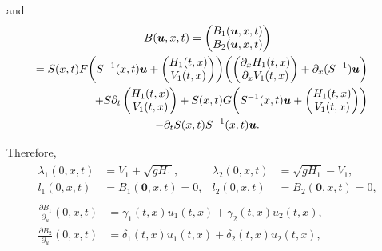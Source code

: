 \documentclass[11pt]{article}
\numberwithin{equation}{section}
\theoremstyle{definition}
\begin{document}
\par\noindent
\vspace*{-5pt}and\vspace*{-5pt}\enlargethispage{\baselineskip}%
\begin{multline}
\label{defB}
B(\boldsymbol{u},x,t)=\begin{pmatrix}B_{1}(\boldsymbol{u},x,t)\\B_{2}(\boldsymbol{u},x,t)\end{pmatrix}
\\
\shoveright{=S(x,t)F\biggl(S^{-1}(x,t)\boldsymbol{u}+\begin{pmatrix}H_{1}(t,x)\\V_{1}(t,x)\end{pmatrix}\biggr)\biggl(\begin{pmatrix} \partial_{x}H_{1}(t,x)\\ \partial_{x}V_{1}(t,x)\end{pmatrix}+\partial_{x}(S^{-1})\boldsymbol{u}\biggr)}\\
\shoveright{+S\partial_{t}\begin{pmatrix}H_{1}(t,x)\\V_{1}(t,x)\end{pmatrix}+S(x,t)G\biggl(S^{-1}(x,t)\boldsymbol{u}+\begin{pmatrix}H_{1}(t,x)\\V_{1}(t,x)\end{pmatrix}\biggr)}\\
-\partial_{t}S(x,t)S^{-1}(x,t)\boldsymbol{u}.
\end{multline}
\par\noindent
\vspace*{-3pt}Therefore,\vspace*{-2pt}
\begin{gather}
\begin{aligned}
\lambda_{1}(0,x,t)&=V_{1}+\sqrt{gH_{1}},&\lambda_{2}(0,x,t)&=\sqrt{gH_{1}}-V_{1}\label{Lambda},\\
l_{1}(0,x,t)&=B_{1}(\boldsymbol{0},x,t)=0,& l_{2}(0,x,t)&=B_{2}(\boldsymbol{0},x,t)=0,
\end{aligned}
\\
\begin{split}
\frac{\partial{B}_{1}}{\partial_{u}}(0,x,t)&=\gamma_{1}(t,x)u_{1}(t,x)+\gamma_{2}(t,x)u_{2}(t,x),\\
\frac{\partial{B}_{2}}{\partial_{u}}(0,x,t)&=\delta_{1}(t,x)u_{1}(t,x)+\delta_{2}(t,x)u_{2}(t,x),
\end{split}
\label{l1l2}
\end{gather}
\end{document}
